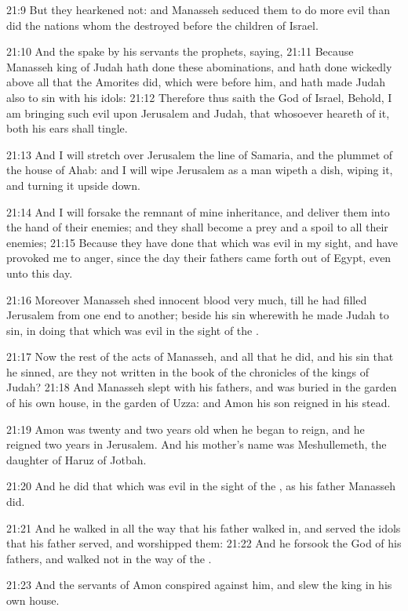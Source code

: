 21:9 But they hearkened not: and Manasseh seduced them to do more evil than did the nations whom the \LORD destroyed before the children of Israel.

21:10 And the \LORD spake by his servants the prophets, saying, 21:11 Because Manasseh king of Judah hath done these abominations, and hath done wickedly above all that the Amorites did, which were before him, and hath made Judah also to sin with his idols: 21:12 Therefore thus saith the \LORD God of Israel, Behold, I am bringing such evil upon Jerusalem and Judah, that whosoever heareth of it, both his ears shall tingle.

21:13 And I will stretch over Jerusalem the line of Samaria, and the plummet of the house of Ahab: and I will wipe Jerusalem as a man wipeth a dish, wiping it, and turning it upside down.

21:14 And I will forsake the remnant of mine inheritance, and deliver them into the hand of their enemies; and they shall become a prey and a spoil to all their enemies; 21:15 Because they have done that which was evil in my sight, and have provoked me to anger, since the day their fathers came forth out of Egypt, even unto this day.

21:16 Moreover Manasseh shed innocent blood very much, till he had filled Jerusalem from one end to another; beside his sin wherewith he made Judah to sin, in doing that which was evil in the sight of the \LORD.

21:17 Now the rest of the acts of Manasseh, and all that he did, and his sin that he sinned, are they not written in the book of the chronicles of the kings of Judah?  21:18 And Manasseh slept with his fathers, and was buried in the garden of his own house, in the garden of Uzza: and Amon his son reigned in his stead.

21:19 Amon was twenty and two years old when he began to reign, and he reigned two years in Jerusalem. And his mother's name was Meshullemeth, the daughter of Haruz of Jotbah.

21:20 And he did that which was evil in the sight of the \LORD, as his father Manasseh did.

21:21 And he walked in all the way that his father walked in, and served the idols that his father served, and worshipped them: 21:22 And he forsook the \LORD God of his fathers, and walked not in the way of the \LORD.

21:23 And the servants of Amon conspired against him, and slew the king in his own house.

